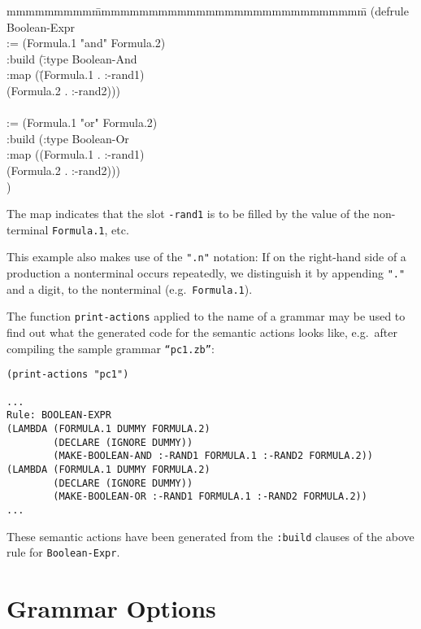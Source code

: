 {\tt \begin{tabbing}
mmmmmmmmm\=mmmmmmmmmmmmmmmmmmmmmmmmmmmmm\=\kill
(defrule Boolean-Expr\\
  \> :=     (Formula.1 "and" Formula.2)\\
  \> :build (\=:type Boolean-And \\
  \>         \>:map (\=(Formula.1 . :-rand1) \\
  \>         \>      \>(Formula.2 . :-rand2))) \\
\\
  \> := (Formula.1 "or" Formula.2) \\
  \> :build (:type Boolean-Or \\
  \>         \>:map ((Formula.1 . :-rand1) \\
  \>         \>      \>(Formula.2 . :-rand2))) \\
  \>)
     \end{tabbing}}

The map indicates that the slot {\tt -rand1} is to be filled by the
value of the non-terminal {\tt Formula.1}, etc.

This example also makes use of the {\tt ".n"} notation: If on the
right-hand side of a production a nonterminal occurs repeatedly, we
distinguish it by appending {\tt "."} and a digit, to the
nonterminal (e.g.\ {\tt Formula.1}).

The function {\tt print-actions}  applied to the
name of a grammar may be used to find out what the generated code for
the semantic actions looks like, e.g.\ after compiling the sample
grammar {\tt ``pc1.zb''}:

{\tt \begin{verbatim}
(print-actions "pc1")

...
Rule: BOOLEAN-EXPR
(LAMBDA (FORMULA.1 DUMMY FORMULA.2)
        (DECLARE (IGNORE DUMMY))
        (MAKE-BOOLEAN-AND :-RAND1 FORMULA.1 :-RAND2 FORMULA.2))
(LAMBDA (FORMULA.1 DUMMY FORMULA.2)
        (DECLARE (IGNORE DUMMY))
        (MAKE-BOOLEAN-OR :-RAND1 FORMULA.1 :-RAND2 FORMULA.2))
...
\end{verbatim}}

These semantic actions have been generated from the {\tt :build}
clauses of the above rule for {\tt Boolean-Expr}.

\section {Grammar Options} \label{Options}
 

